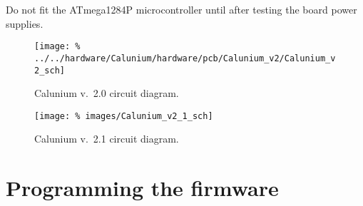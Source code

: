Do not fit the ATmega1284P microcontroller until after testing the
board power supplies.

\begin{landscape}
  \begin{figure}[p]
    \centering
    \texttt{[image: \%
      ../../hardware/Calunium/hardware/pcb/Calunium\_v2/Calunium\_v2\_sch]}  
    \caption{Calunium v.~2.0 circuit diagram.}
    \label{fig:calunium-v2.0-cct-diag}
  \end{figure}
  \begin{figure}[p]
    \centering
    \texttt{[image: \%
      images/Calunium\_v2\_1\_sch]}
    \caption{Calunium v.~2.1 circuit diagram.}
    \label{fig:calunium-v2.1-cct-diag}
  \end{figure}
\end{landscape}

\section{Programming the firmware}
